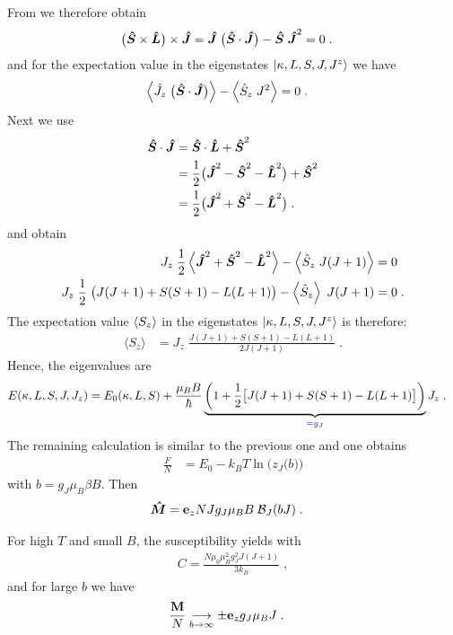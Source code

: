 {From  we therefore obtain
%
\begin{align*}
 \big( {\boldsymbol{ \hat S}}\times {\boldsymbol{ \hat L}} \big)\times {\boldsymbol{ \hat J}} 
 &= {\boldsymbol{ \hat J}}\;\big( {\boldsymbol{ \hat S}}\cdot {\boldsymbol{ \hat J}} \big)
 -{\boldsymbol{ \hat S}}\; {\boldsymbol{ \hat J}}^{2}  = 0\;.
\end{align*}
%
and for the expectation value in the  eigenstates  $ \ket{\kappa,L,S,J,J^{z}}$
we have
%
\begin{align*}
\left\langle \hat {J}_{z}\;\big( {\boldsymbol{ \hat S}}\cdot {\boldsymbol{ \hat J}} \big)\right\rangle -  \left\langle\hat {S}_{z}\; J^{2} \right\rangle&=0\;.
\end{align*}
%
Next we use
%
\begin{align*}
{\boldsymbol{ \hat S}} \cdot {\boldsymbol{ \hat J}} &= {\boldsymbol{ \hat S}} \cdot {\boldsymbol{ \hat L}} + {\boldsymbol{ \hat S}}^{2}\\
&=\frac{1}{2}\big( {\boldsymbol{ \hat J}}^{2}-{\boldsymbol{ \hat S}}^{2}-{\boldsymbol{ \hat L}}^{2} \big) + {\boldsymbol{ \hat S}}^{2}\\
&=\frac{1}{2}\big( {\boldsymbol{ \hat J}}^{2}+{\boldsymbol{ \hat S}}^{2}-{\boldsymbol{ \hat L}}^{2} \big) \;.
\end{align*}
and obtain
%
\begin{align*}
 J_{z}\;\frac{1}{2}\left\langle {\boldsymbol{ \hat J}}^{2}+{\boldsymbol{ \hat S}}^{2}-{\boldsymbol{ \hat L}}^{2}\right\rangle-  \left\langle \hat {S}_{z}\; J(J+1) \right\rangle&=0\\
  J_{z}\;\frac{1}{2}\;\big(J(J+1)+S(S+1)-L(L+1)\big) -  \left\langle \hat {S}_{z}\right\rangle\; J(J+1)  &=0\;.
\end{align*}
%
%
The expectation value $\left\langle S_{z}\right\rangle$ in the eigenstates  $ \ket{\kappa,L,S,J,J^{z}}$
is therefore:
\begin{align*}
\langle S_{z}\rangle 
&=
J_{z}\; \frac{ J(J+1)+S(S+1)-L(L+1) }{2J(J+1)}\;.
\end{align*}
%
%
Hence, the eigenvalues are
%
\begin{align*}
E(\kappa,L,S,J,J_{z}) &= E_{0}(\kappa,L,S) + \frac{\mu_{B}B}{\hbar}\underbrace{
\bigg(  1+ \frac{1}{2}\big[ J(J+1)+S(S+1)-L(L+1) \big] \bigg)
}_{\color{blue} = g_{J}} J_{z}\;.
\end{align*}
%
}
The remaining calculation is similar to the previous one and one obtains
%
\begin{align*}
\frac{F}{N} 
&= E_{0}
-k_{B}T \ln\bigg(z_{J}\big(b\big) \bigg)
\end{align*}
%
with $b=g_{J}\mu_{B}\beta B$. Then
%
\begin{align*}
{\boldsymbol{ \hat M}} &= \mathbf e_{z} N J g_{J}\mu_{B}B\;{\cal B}_{J}(b J)\;.
\end{align*}
%

For high $T$ and small $B$, the susceptibility yields
%
with 
%
\begin{align*}
C = \frac{N \mu_{0}\mu_{B}^{2}g_{J}^{2} J(J+1)}{3 k_{B}}\;,
\end{align*}
%
and for large $b$ we have
%
\begin{align*}
\frac{\mathbf M}{N}
&\underset{b\to\infty}{\longrightarrow} \pm  \mathbf e_{z} g_{J}\mu_{B}J \;.
\end{align*}

